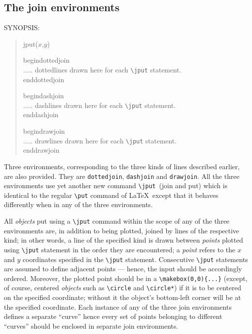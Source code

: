 \subsection{The join environments}
\begin{tt}
SYNOPSIS:
\begin{quote}
\bs jput($x$,$y$)\rb

\bs begin\lb dottedjoin%
\rb\\
.....\hspace*{1in} dottedlines drawn here for each \verb|\jput| statement.\\
\bs end\lb dottedjoin\rb

\bs begin\lb dashjoin\rb[{\it stretch}]%
\\
.....\hspace*{1in} dashlines drawn here for each \verb|\jput| statement.\\
\bs end\lb dashjoin\rb

\bs begin\lb drawjoin\rb[{\it stretch}]\\
.....\hspace*{1in} drawlines drawn here for each \verb|\jput| statement.\\
\bs end\lb drawjoin\rb

\end{quote}
\end{tt}

Three environments, corresponding to the three kinds of lines described
earlier, are also provided. They are {\tt dottedjoin}, {\tt dashjoin} and
{\tt drawjoin}. All the three environments use yet
another new command \verb|\jput|\footnotemark\ (join and put) which is
identical to the regular \verb|\put| command of \LaTeX\ except that it
behaves differently when in any of the three environments.

 All {\it objects\/} put using a \verb|\jput| command within the
scope of any of the three environments are, in addition to being plotted,
joined by lines of the respective kind; in other words, a line of the
specified kind is drawn between {\it points\/} plotted using \verb|\jput|
statement in the order they are encountered; a {\it point\/} refers to the $x$
and $y$ coordinates specified in the \verb|\jput| statement. Consecutive
\verb|\jput| statements are assumed to define adjacent points --- hence, the
input should be accordingly ordered. Moreover, the plotted point should be in
a \verb|\makebox(0,0){...}| (except, of course, centered {\it objects\/} such
as \verb|\circle| and \verb|\circle*|) if it is to be centered on the
specified coordinate; without it the object's bottom-left corner will be at
the specified coordinate. Each instance of any of the three join
environments defines a separate ``curve'' hence every set of points belonging
to different ``curves'' should be enclosed in separate join environments.

